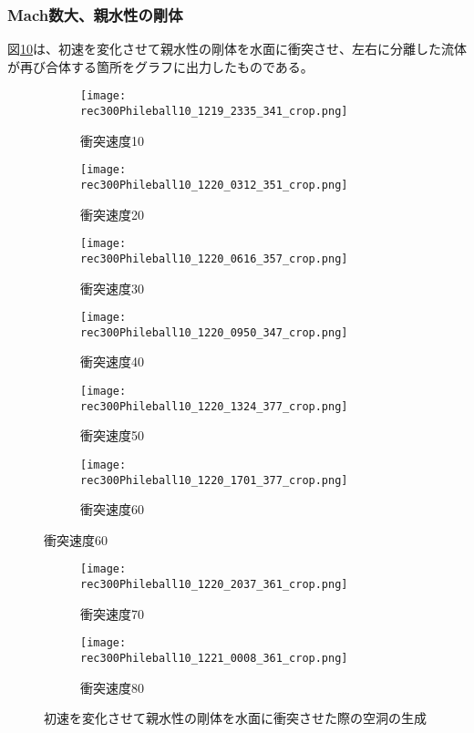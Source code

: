 \documentclass[]{jsarticle}
\begin{document}
\subsubsection{Mach数大、親水性の剛体}
図\ref{fig:hydrophilic}は、初速を変化させて親水性の剛体を水面に衝突させ、左右に分離した流体が再び合体する箇所をグラフに出力したものである。
\begin{figure}[H]
  \centering
\begin{subfigure}{0.3\columnwidth}
  \centering
  \texttt{[image: rec300Phileball10\_1219\_2335\_341\_crop.png]}
  \caption{衝突速度10}
  \label{fig:philevel10}
\end{subfigure}
\begin{subfigure}{0.3\columnwidth}
  \centering
  \texttt{[image: rec300Phileball10\_1220\_0312\_351\_crop.png]}
  \caption{衝突速度20}
  \label{fig:philevel20}
\end{subfigure}
\begin{subfigure}{0.3\columnwidth}
  \centering
  \texttt{[image: rec300Phileball10\_1220\_0616\_357\_crop.png]}
  \caption{衝突速度30}
  \label{fig:philevel30}
\end{subfigure}
\begin{subfigure}{0.3\columnwidth}
  \centering
  \texttt{[image: rec300Phileball10\_1220\_0950\_347\_crop.png]}
  \caption{衝突速度40}
  \label{fig:philevel40}
\end{subfigure}
\begin{subfigure}{0.3\columnwidth}
  \centering
  \texttt{[image: rec300Phileball10\_1220\_1324\_377\_crop.png]}
  \caption{衝突速度50}
  \label{fig:philevel50}
\end{subfigure}
\begin{subfigure}{0.3\columnwidth}
  \centering
  \texttt{[image: rec300Phileball10\_1220\_1701\_377\_crop.png]}
  \caption{衝突速度60}
  \label{fig:philevel60}
\end{subfigure}
\end{figure}
\clearpage
\begin{figure}
\ContinuedFloat
  \begin{subfigure}{0.3\columnwidth}
  \centering
  \texttt{[image: rec300Phileball10\_1220\_2037\_361\_crop.png]}
  \caption{衝突速度70}
  \label{fig:philevel70}
\end{subfigure}
\begin{subfigure}{0.3\columnwidth}
  \centering
  \texttt{[image: rec300Phileball10\_1221\_0008\_361\_crop.png]}
  \caption{衝突速度80}
  \label{fig:philevel80}
\end{subfigure}
\caption{初速を変化させて親水性の剛体を水面に衝突させた際の空洞の生成}
\label{fig:hydrophilic}
\end{figure}
\end{document}
